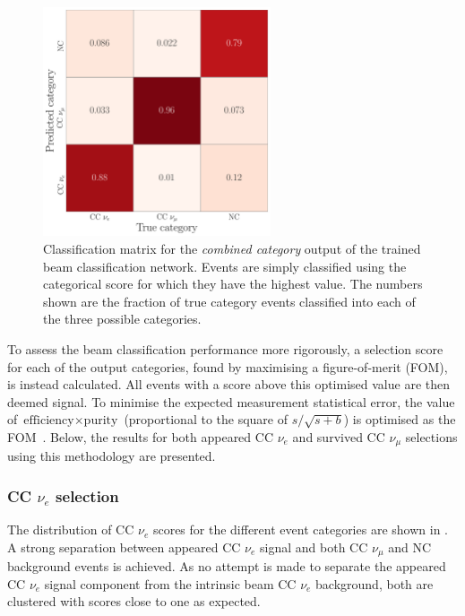 \begin{figure} %
    \includegraphics[width=0.6\textwidth]{diagrams/7-results/final_comb_cat_confusion.pdf}
    \caption[Classification matrix for the combined category output of the beam classification
        network] {Classification matrix for the \emph{combined category} output of the trained
        beam classification network. Events are simply classified using the categorical score for
        which they have the highest value. The numbers shown are the fraction of true category
        events classified into each of the three possible categories.}
    \label{fig:final_comb_cat_confusion}
\end{figure}

To assess the beam classification performance more rigorously, a selection score for each of the
output categories, found by maximising a figure-of-merit (FOM), is instead calculated. All events
with a score above this optimised value are then deemed signal. To minimise the expected
measurement statistical error, the value of $\text{efficiency}\times\text{purity}$ (proportional
to the square of $s/\sqrt{s+b}$) is optimised as the FOM~\cite{list2002}. Below, the results for
both appeared CC $\nu_{e}$ and survived CC $\nu_{\mu}$ selections using this methodology are
presented.

\subsubsection*{CC $\nu_{e}$ selection} %

The distribution of CC $\nu_{e}$ scores for the different event categories are shown in
. A strong separation between appeared CC $\nu_{e}$ signal
and both CC $\nu_{\mu}$ and NC background events is achieved. As no attempt is made to separate
the appeared CC $\nu_{e}$ signal component from the intrinsic beam CC $\nu_{e}$ background, both
are clustered with scores close to one as expected.

